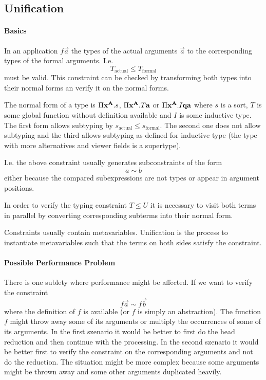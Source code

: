 \subsection{Unification}


\paragraph{Basics}

In an application $f \vec a$ the types of the actual arguments $\vec a$ to the
corresponding types of the formal arguments. I.e.
$$
    T_\text{actual} \le T_\text{formal}
$$
must be valid. This constraint can be checked by transforming both types into
their normal forms an verify it on the normal forms.

The normal form of a type is $\Pi {{\mathbf x}^{{\mathbf A}}}. s$, $\Pi {{\mathbf x}^{{\mathbf A}}}. T {\mathbf a}$ or $\Pi {{\mathbf x}^{{\mathbf A}}} . I {\mathbf q} {\mathbf a}$ where $s$ is a sort, $T$ is some global
function without definition available and $I$ is some inductive type. The first
form allows subtyping by $s_\text{actual} \le s_\text{formal}$. The second one
does not allow subtyping and the third allows subtyping as defined for inductive
type (the type with more alternatives and viewer fields is a supertype).

I.e. the above constraint usually generates subconstraints of the form
$$
    a \sim b
$$
either because the compared subexpressions are not types or appear in argument
positions.

In order to verify the typing constraint $T \le U$ it is necessary to visit both
terms in parallel by converting corresponding subterms into their normal form.

Constraints usually contain metavariables. Unification is the process to
instantiate metavariables such that the terms on both sides satisfy the
constraint.






\paragraph{Possible Performance Problem}
There is one sublety where performance might be affected. If we want to verify
the constraint
$$
    f \vec a \sim f \vec b
$$
where the definition of $f$ is available (or $f$ is simply an abstraction). The
function $f$ might throw away some of its arguments or multiply the occurrences
of some of its arguments. In the first szenario it would be better to first do
the head reduction and then continue with the processing. In the second szenario
it would be better first to verify the constraint on the corresponding arguments
and not do the reduction. The situation might be more complex because some
arguments might be thrown away and some other arguments duplicated heavily.

